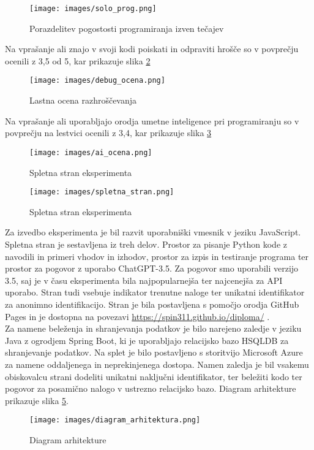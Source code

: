 \documentclass[a4paper,12pt,openright]{book}
\begin{document}
\begin{figure}[H]
    \centering
    \texttt{[image: images/solo\_prog.png]}
    \caption{Porazdelitev pogostosti programiranja izven tečajev}
    \label{fig:solo_prog}
\end{figure}
Na vprašanje ali znajo v svoji kodi poiskati in odpraviti hrošče so v povprečju ocenili z 3,5 od 5, kar prikazuje slika \ref{fig:debug_ocena} \\
\begin{figure}[H]
    \centering
    \texttt{[image: images/debug\_ocena.png]}
    \caption{Lastna ocena razhroščevanja}
    \label{fig:debug_ocena}
\end{figure}
Na vprašanje ali uporabljajo orodja umetne inteligence pri programiranju so v povprečju na lestvici ocenili z 3,4, kar prikazuje slika \ref{fig:ai_ocena}

\begin{figure}[H]
    \centering
    \texttt{[image: images/ai\_ocena.png]}
    \caption{Spletna stran eksperimenta}
    \label{fig:ai_ocena}
\end{figure}



\begin{figure}[H]
    \centering
    \texttt{[image: images/spletna\_stran.png]}
    \caption{Spletna stran eksperimenta}
    \label{fig:spletna_stran}
\end{figure}

Za izvedbo eksperimenta je bil razvit uporabniški vmesnik v jeziku JavaScript. Spletna stran je sestavljena iz treh delov. Prostor za pisanje Python kode z navodili in primeri vhodov in izhodov, prostor za izpis in testiranje programa ter prostor za pogovor z uporabo ChatGPT-3.5. Za pogovor smo uporabili verzijo 3.5, saj je v času eksperimenta bila najpopularnejša ter najcenejša za API uporabo. Stran tudi vsebuje indikator trenutne naloge ter unikatni identifikator za anonimno identifikacijo. Stran je bila postavljena s pomočjo orodja GitHub Pages in je dostopna na povezavi \href{https://spin311.github.io/diploma/}{ https://spin311.github.io/diploma/} . \\
Za namene beleženja in shranjevanja podatkov je bilo narejeno zaledje v jeziku Java z ogrodjem Spring Boot, ki je uporabljajo relacijsko bazo HSQLDB za shranjevanje podatkov. Na splet je bilo postavljeno s storitvijo Microsoft Azure za namene oddaljenega in neprekinjenega dostopa. Namen zaledja je bil vsakemu obiskovalcu strani dodeliti unikatni naključni identifikator, ter beležiti kodo ter pogovor za posamično nalogo v ustrezno relacijsko bazo. Diagram arhitekture prikazuje slika \ref{fig:arhitektura}. \\
\begin{figure}[H]
    \centering
    \texttt{[image: images/diagram\_arhitektura.png]}
    \caption{Diagram arhitekture}
    \label{fig:arhitektura}
\end{figure}
\end{document}
